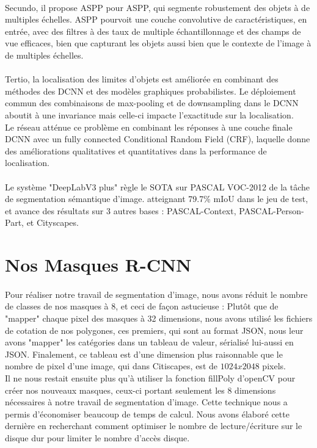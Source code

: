\documentclass[
10pt, %
a4paper, %
oneside, %
headinclude,footinclude, %
]{scrartcl}
\begin{document}
\paragraph{}Secundo, il propose ASPP pour \gls{ASPP}, qui segmente robustement des objets à de multiples échelles. ASPP pourvoit une couche convolutive de caractéristiques, en entrée, avec des filtres à des taux de multiple échantillonnage et des champs de vue efficaces, bien que capturant les objets aussi bien que le contexte de l’image à de multiples échelles.

\paragraph{}Tertio, la localisation des limites d’objets est améliorée en combinant des méthodes des DCNN et des modèles graphiques probabilistes. Le déploiement commun des combinaisons de max-pooling et de downsampling dans le DCNN aboutit à une invariance mais celle-ci impacte l’exactitude sur la localisation.
\\
Le réseau atténue ce problème en combinant les réponses à une couche finale DCNN avec un fully connected Conditional Random Field (CRF), laquelle donne des améliorations qualitatives et quantitatives dans la performance de localisation.

\paragraph{}Le système "DeepLabV3 plus" règle le SOTA sur PASCAL VOC-2012 de la tâche de segmentation sémantique d’image. atteignant 79.7\% mIoU dans le jeu de test, et avance des résultats  sur 3 autres bases : PASCAL-Context, PASCAL-Person-Part, et Cityscapes.

\section{Nos Masques R-CNN}
\paragraph{}Pour réaliser notre travail de segmentation d’image, nous avons réduit le nombre de classes de nos masques à 8, et ceci de façon astucieuse : Plutôt que de "mapper" chaque pixel des masques à 32 dimensions, nous avons utilisé les fichiers de cotation de nos polygones, ces premiers, qui sont au format JSON, nous leur avons "mapper" les catégories dans un tableau de valeur, sérialisé lui-aussi en JSON. Finalement, ce tableau est d’une dimension plus raisonnable que le nombre de pixel d’une image, qui dans Citiscapes, est de $1024x2048$ pixels.
\\
Il ne nous restait ensuite plus qu’à utiliser la fonction fillPoly d’openCV pour créer nos nouveaux masques, ceux-ci portant seulement les 8 dimensions nécessaires à notre travail de segmentation d’image. Cette technique nous a permis d’économiser beaucoup de temps de calcul. Nous avons élaboré cette dernière en recherchant comment optimiser le nombre de lecture/écriture sur le disque dur pour limiter le nombre d’accès disque.
\end{document}
